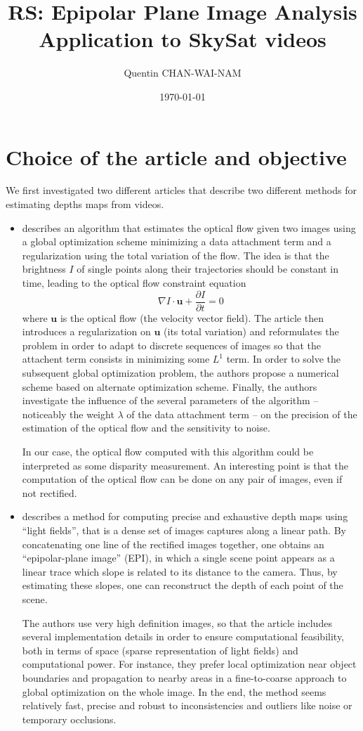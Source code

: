 \documentclass{article}
\title{RS: Epipolar Plane Image Analysis\\Application to SkySat videos}
\date{\today}
\author{Quentin CHAN-WAI-NAM}
\newcommand{\Dpar}[2]{\frac{\partial#1}{\partial#2}}
\newcommand{\vect}[1]{\mathbf{#1}}
\theoremstyle{definition}
\begin{document}
\maketitle


\section{Choice of the article and objective}


We first investigated two different articles that describe two different methods for estimating depths maps from videos.
\begin{itemize}
 \item \cite{art:perez13:tvl1} describes an algorithm that estimates the optical flow given two images using a global optimization scheme minimizing a data attachment term and a regularization using the total variation of the flow. The idea is that the brightness $I$ of single points along their trajectories should be constant in time, leading to the optical flow constraint equation
 \[ \nabla I \cdot \vect{u} + \Dpar{I}{t} = 0 \]
 where $\vect{u}$ is the optical flow (the velocity vector field). The article then introduces a regularization on $\vect{u}$ (its total variation) and reformulates the problem in order to adapt to discrete sequences of images so that the attachent term consists in minimizing some $L^1$ term. In order to solve the subsequent global optimization problem, the authors propose a numerical scheme based on alternate optimization scheme. Finally, the authors investigate the influence of the several parameters of the algorithm -- noticeably the weight $\lambda$ of the data attachment term -- on the precision of the estimation of the optical flow and the sensitivity to noise.
 
 In our case, the optical flow computed with this algorithm could be interpreted as some disparity measurement. An interesting point is that the computation of the optical flow can be done on any pair of images, even if not rectified.
 
 \item \cite{art:kim13:lfields} describes a method for computing precise and exhaustive depth maps using ``light fields'', that is a dense set of images captures along a linear path. By concatenating one line of the rectified images together, one obtains an ``epipolar-plane image'' (EPI), in which a single scene point appears as a linear trace which slope is related to its distance to the camera. Thus, by estimating these slopes, one can reconstruct the depth of each point of the scene.
 
 The authors use very high definition images, so that the article includes several implementation details in order to ensure computational feasibility, both in terms of space (sparse representation of light fields) and computational power. For instance, they prefer local optimization near object boundaries and propagation to nearby areas in a fine-to-coarse approach to global optimization on the whole image. In the end, the method seems relatively fast, precise and robust to inconsistencies and outliers like noise or temporary occlusions.
\end{itemize}
\end{document}
